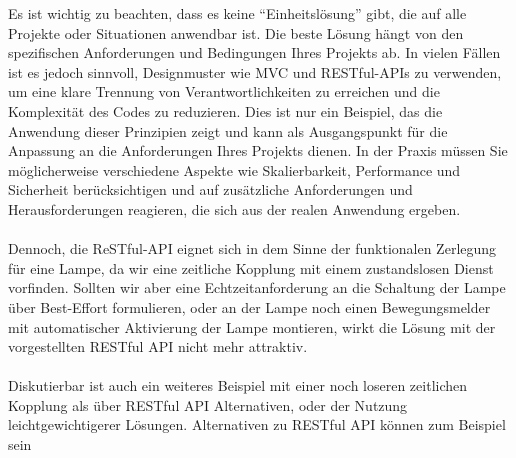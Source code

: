 \documentclass[../vs-script-first-v01.tex]{subfiles}
\begin{document}
Es ist wichtig zu beachten, dass es keine \enquote{Einheitslösung} gibt, die auf alle Projekte oder Situationen anwendbar ist. Die beste Lösung hängt von den spezifischen Anforderungen und Bedingungen Ihres Projekts ab. In vielen Fällen ist es jedoch sinnvoll, Designmuster wie MVC und RESTful-APIs zu verwenden, um eine klare Trennung von Verantwortlichkeiten zu erreichen und die Komplexität des Codes zu reduzieren. Dies ist nur ein Beispiel, das die Anwendung dieser Prinzipien zeigt und kann als Ausgangspunkt für die Anpassung an die Anforderungen Ihres Projekts dienen. In der Praxis müssen Sie möglicherweise verschiedene Aspekte wie Skalierbarkeit, Performance und Sicherheit berücksichtigen und auf zusätzliche Anforderungen und Herausforderungen reagieren, die sich aus der realen Anwendung ergeben.
\\\\
Dennoch, die ReSTful-API eignet sich in dem Sinne der funktionalen Zerlegung für eine Lampe, da wir eine zeitliche Kopplung mit einem zustandslosen Dienst vorfinden. Sollten wir aber eine Echtzeitanforderung an die Schaltung der Lampe über Best-Effort formulieren, oder an der Lampe noch einen Bewegungsmelder mit automatischer Aktivierung der Lampe montieren, wirkt die Lösung mit der vorgestellten RESTful API nicht mehr attraktiv. 
\\\\
Diskutierbar ist auch ein weiteres Beispiel mit einer noch loseren zeitlichen Kopplung als über RESTful API Alternativen, oder der Nutzung leichtgewichtigerer Lösungen.
Alternativen zu RESTful API können zum Beispiel sein
\end{document}
